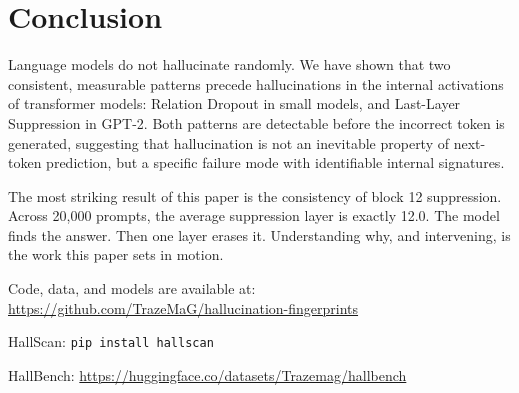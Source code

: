 \documentclass[11pt,a4paper]{article}
\begin{document}
\section{Conclusion}

Language models do not hallucinate randomly. We have shown
that two consistent, measurable patterns precede hallucinations
in the internal activations of transformer models: Relation
Dropout in small models, and Last-Layer Suppression in GPT-2.
Both patterns are detectable before the incorrect token is
generated, suggesting that hallucination is not an inevitable
property of next-token prediction, but a specific failure
mode with identifiable internal signatures.

The most striking result of this paper is the consistency
of block 12 suppression. Across 20,000 prompts, the average
suppression layer is exactly 12.0. The model finds the
answer. Then one layer erases it. Understanding why, and
intervening, is the work this paper sets in motion.

\bigskip
\noindent Code, data, and models are available at:
\url{https://github.com/TrazeMaG/hallucination-fingerprints}

\noindent HallScan: \texttt{pip install hallscan}

\noindent HallBench:
\url{https://huggingface.co/datasets/Trazemag/hallbench}


\end{document}
